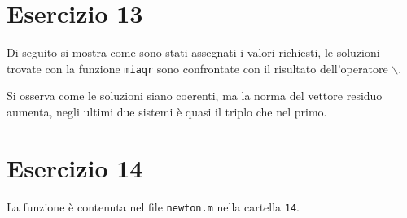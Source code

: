 \documentclass[10pt,a4paper]{article}
\begin{document}
\section*{Esercizio 13}
Di seguito si mostra come sono stati assegnati i valori richiesti, le soluzioni trovate con la funzione \texttt{miaqr} sono confrontate con il risultato dell'operatore \texttt{$\backslash$}.

Si osserva come le soluzioni siano coerenti, ma la norma del vettore residuo aumenta, negli ultimi due sistemi è quasi il triplo che nel primo.\\
\pagebreak
\section*{Esercizio 14}
La funzione è contenuta nel file \texttt{newton.m} nella cartella \texttt{14}.

\pagebreak
\end{document}
